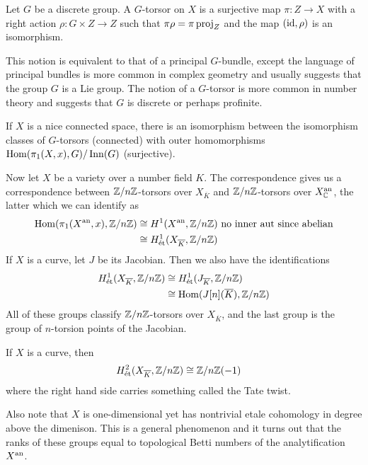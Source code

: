 \documentclass[12pt]{article}
\begin{document}
\begin{definition}
    Let $G$ be a discrete group. A $G$-torsor on $X$ is a surjective map $\pi:Z\to X$ with a right action $\rho: G \times Z \to Z$ such that $\pi\rho = \pi\operatorname{proj}_Z$ and the map $(\operatorname{id},\rho)$ is an isomorphism.
\end{definition} 
This notion is equivalent to that of a principal $G$-bundle, except the language of principal bundles is more common in complex geometry and usually suggests that the group $G$ is a Lie group. The notion of a $G$-torsor is more common in number theory and suggests that $G$ is discrete or perhaps profinite.

\begin{proposition}
    If $X$ is a nice connected space, there is an isomorphism between the isomorphism classes of $G$-torsors (connected) with outer homomorphisms $\operatorname{Hom}(\pi_1(X,x), G) / \operatorname{Inn}(G)$ (surjective).
\end{proposition}
Now let $X$ be a variety over a number field $K$. The correspondence gives us a correspondence between $\mathbb{Z}/n\mathbb{Z}$-torsors over $X_{\overline K}$ and $\mathbb{Z}/n\mathbb{Z}$-torsors over $X^{\operatorname{an}}_{\mathbb{C}}$, the latter which we can identify as \begin{align*}
    \operatorname{Hom}(\pi_1(X^{\operatorname{an}}, x), \mathbb{Z}/n\mathbb{Z}) &\cong H^1(X^{\operatorname{an}}, \mathbb{Z}/n\mathbb{Z}) \text{ no inner aut since abelian}\\
    &\cong H^1_{\text{\'et}}(X_{\overline K}, \mathbb{Z}/n\mathbb{Z}) 
\end{align*}
If $X$ is a curve, let $J$ be its Jacobian. Then we also have the identifications \begin{align*}
    H_{\text{\'et}}^{1}(X_{\overline K}, \mathbb{Z}/n\mathbb{Z}) &\cong H_{\text{\'et}}^{1}(J_{\overline K}, \mathbb{Z}/n\mathbb{Z}) \\
    &\cong \operatorname{Hom}(J[n](\overline{K}), \mathbb{Z}/n\mathbb{Z}) \\
\end{align*}
All of these groups classify $\mathbb{Z}/n\mathbb{Z}$-torsors over $X_{\overline K}$, and the last group is the group of $n$-torsion points of the Jacobian. 
\begin{example}
    If $X$ is a curve, then \begin{align*}
        H_{\text{\'et}}^{2}(X_{\overline K}, \mathbb{Z}/n\mathbb{Z}) &\cong \mathbb{Z}/n\mathbb{Z}(-1)
    \end{align*} where the right hand side carries something called the Tate twist. 
\end{example}
Also note that $X$ is one-dimensional yet has nontrivial etale cohomology in degree above the dimenison. This is a general phenomenon and it turns out that the ranks of these groups equal to topological Betti numbers of the analytification $X^{\operatorname{an}}$. 
\end{document}
